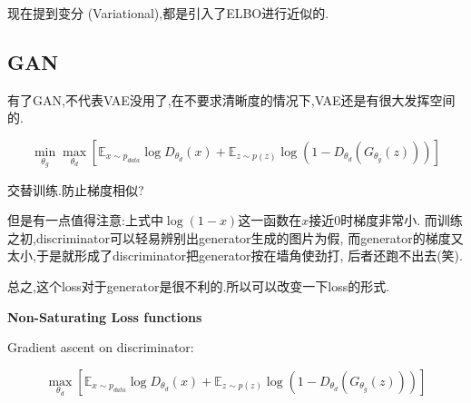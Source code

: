 	现在提到变分 (Variational),都是引入了ELBO进行近似的.

	\subsection{GAN}

	有了GAN,不代表VAE没用了,在不要求清晰度的情况下,VAE还是有很大发挥空间的.
	
	\begin{equation}
		\min _{\theta_{g}} \max _{\theta_{d}}\left[\mathbb{E}_{x \sim p_{d a t a}} \log D_{\theta_{d}}(x)+\mathbb{E}_{z \sim p(z)} \log \left(1-D_{\theta_{d}}\left(G_{\theta_{g}}(z)\right)\right)\right]
	\end{equation}

	交替训练.防止梯度相似?
	
	
	但是有一点值得注意:上式中$\log(1-x)$这一函数在$x$接近$0$时梯度非常小.
	而训练之初,discriminator可以轻易辨别出generator生成的图片为假,
	而generator的梯度又太小,于是就形成了discriminator把generator按在墙角使劲打,
	后者还跑不出去(笑).
	
	总之,这个loss对于generator是很不利的.所以可以改变一下loss的形式.
	
	\textbf{Non-Saturating Loss functions}
	
	Gradient ascent on discriminator:
	
	\begin{equation}
	\max_{\theta_d}\left[\mathbb{E}_{x\sim p_{data}}\log D_{\theta_d}(x)+\mathbb{E}_{z\sim p(z)}\log(1-D_{\theta_d}(G_{\theta_g}(z)))\right]
	\end{equation}

